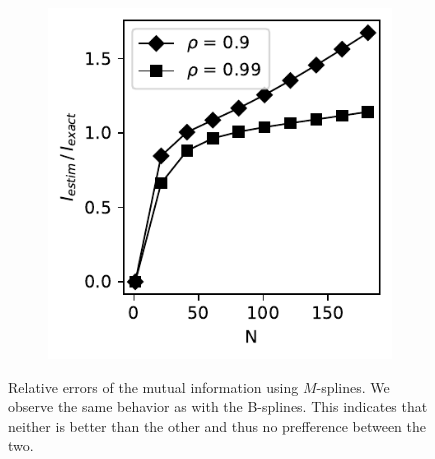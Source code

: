 \documentclass[../Thesis.tex]{subfiles}
\begin{document}
\begin{figure}[H]
\begin{subfigure}[t]{0.32\textwidth}
        \caption{}
    \end{subfigure}%
    ~
    \begin{subfigure}[t]{0.32\textwidth}
        \centering
        \includegraphics[width=\linewidth]{figures/ND examples/MI calc/gaussian example original high corr - M-spline - relative error.pdf}
        \caption{}
    \end{subfigure}
    \caption{Relative errors of the mutual information using $M$-splines. We observe the same behavior as with the B-splines. This indicates that neither is better than the other and thus no prefference between the two.}
    \label{fig:M-spline approach results MI - relative error}
\end{figure}
\end{document}
